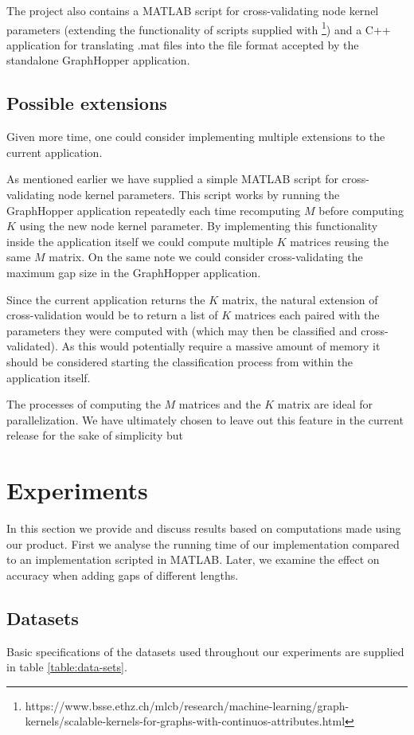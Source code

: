 \documentclass{article}
\begin{document}
The project also contains a MATLAB script for cross-validating node kernel parameters (extending the functionality of scripts supplied with \cite{graphhopper}\footnote{https://www.bsse.ethz.ch/mlcb/research/machine-learning/graph-kernels/scalable-kernels-for-graphs-with-continuos-attributes.html}) and a C++ application for translating .mat files into the file format accepted by the standalone GraphHopper application.

\subsection{Possible extensions}
Given more time, one could consider implementing multiple extensions to the current application.

As mentioned earlier we have supplied a simple MATLAB script for cross-validating node kernel parameters. This script works by running the GraphHopper application repeatedly each time recomputing $M$ before computing $K$ using the new node kernel parameter. By implementing this functionality inside the application itself we could compute multiple $K$ matrices reusing the same $M$ matrix. On the same note we could consider cross-validating the maximum gap size in the GraphHopper application.

Since the current application returns the $K$ matrix, the natural extension of cross-validation would be to return a list of $K$ matrices each paired with the parameters they were computed with (which may then be classified and cross-validated). As this would potentially require a massive amount of memory it should be considered starting the classification process from within the application itself.

The processes of computing the $M$ matrices and the $K$ matrix are ideal for parallelization. We have ultimately chosen to leave out this feature in the current release for the sake of simplicity but 

\section{Experiments}
In this section we provide and discuss results based on computations made using our product. First we analyse the running time of our implementation compared to an implementation scripted in MATLAB. Later, we examine the effect on accuracy when adding gaps of different lengths.

\subsection{Datasets}
Basic specifications of the datasets used throughout our experiments are supplied in table \ref{table:data-sets}.
\end{document}
